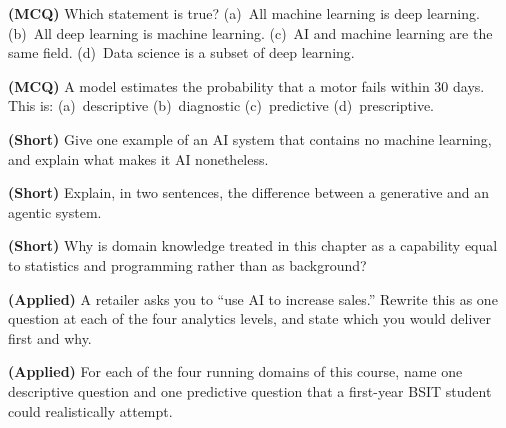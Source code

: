 \begin{reviewq}
  \item \textbf{(MCQ)} Which statement is true?
        (a)~All machine learning is deep learning.
        (b)~All deep learning is machine learning.
        (c)~AI and machine learning are the same field.
        (d)~Data science is a subset of deep learning.
  \item \textbf{(MCQ)} A model estimates the probability that a motor fails within
        30 days. This is:
        (a)~descriptive (b)~diagnostic (c)~predictive (d)~prescriptive.
  \item \textbf{(Short)} Give one example of an AI system that contains no machine
        learning, and explain what makes it AI nonetheless.
  \item \textbf{(Short)} Explain, in two sentences, the difference between a
        generative and an agentic system.
  \item \textbf{(Short)} Why is domain knowledge treated in this chapter as a
        capability equal to statistics and programming rather than as background?
  \item \textbf{(Applied)} A retailer asks you to ``use AI to increase sales.''
        Rewrite this as one question at each of the four analytics levels, and
        state which you would deliver first and why.
  \item \textbf{(Applied)} For each of the four running domains of this course,
        name one descriptive question and one predictive question that a
        first-year BSIT student could realistically attempt.
\end{reviewq}
